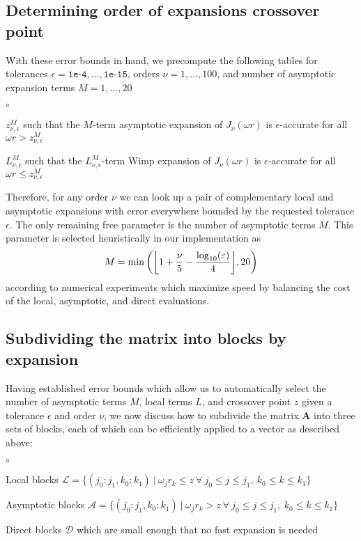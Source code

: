 

\subsection{Determining order of expansions crossover point}

With these error bounds in hand, we precompute the following tables for
tolerances $\epsilon = \texttt{1e-4}, \dots, \texttt{1e-15}$, orders $\nu = 1,
\dots, 100$, and number of asymptotic expansion terms $M = 1, \dots, 20$
\begin{list}{$\circ$}{}
    \item $z_{\nu, \epsilon}^M$ such that the $M$-term asymptotic expansion of
    $J_\nu(\omega r)$ is $\epsilon$-accurate for all $\omega r > z_{\nu,
    \epsilon}^M$
    \item $L_{\nu, \epsilon}^M$ such that the $L_{\nu, \epsilon}^M$-term Wimp
    expansion of $J_\nu(\omega r)$ is $\epsilon$-accurate for all $\omega r \leq
    z_{\nu, \epsilon}^M$
\end{list}
Therefore, for any order $\nu$ we can look up a pair of complementary local and
asymptotic expansions with error everywhere bounded by the requested tolerance
$\epsilon$. The only remaining free parameter is the number of asymptotic terms
$M$. This parameter is selected heuristically in our implementation as 
\begin{align} \label{eq:num-asy-terms}
    M = \min\left(\flr{1 + \frac{\nu}{5} - \frac{\log_{10}(\epsilon)}{4}}, 20\right)
\end{align}
according to numerical experiments which maximize speed by balancing the cost of
the local, asymptotic, and direct evaluations.

\subsection{Subdividing the matrix into blocks by expansion}

Having established error bounds which allow us to automatically select the
number of asymptotic terms $M$, local terms $L$, and crossover point $z$ given a
tolerance $\epsilon$ and order $\nu$, we now discuss how to subdivide the matrix
$\bm{A}$ into three sets of blocks, each of which can be efficiently applied to
a vector as described above:
\begin{list}{$\circ$}{}
    \item Local blocks $\mathscr{L} = \big\{ (j_0:j_1, k_0:k_1) \ | \ \omega_j
    r_k \leq z \ \forall \ j_0 \leq j \leq j_1, \ k_0 \leq k \leq k_1 \big\}$
    \item Asymptotic blocks $\mathscr{A} = \big\{ (j_0:j_1, k_0:k_1) \ | \
    \omega_j r_k > z \ \forall \ j_0 \leq j \leq j_1, \ k_0 \leq k \leq k_1
    \big\}$
    \item Direct blocks $\mathscr{D}$ which are small enough that no fast
    expansion is needed
\end{list}

